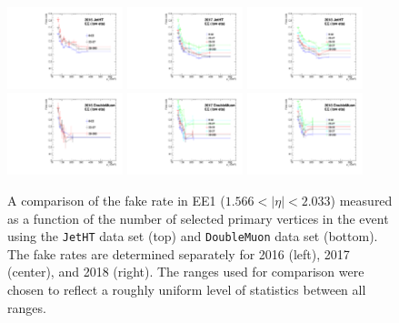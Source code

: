\begin{figure}[!htbp]
\centering
\includegraphics[width=0.3\textwidth]{fig/compare_pv_EE1_2016_jetht.pdf}
\includegraphics[width=0.3\textwidth]{fig/compare_pv_EE1_2017_jetht.pdf}
\includegraphics[width=0.3\textwidth]{fig/compare_pv_EE1_2018_jetht.pdf}
\includegraphics[width=0.3\textwidth]{fig/compare_pv_EE1_2016_doublemuon.pdf}
\includegraphics[width=0.3\textwidth]{fig/compare_pv_EE1_2017_doublemuon.pdf}
\includegraphics[width=0.3\textwidth]{fig/compare_pv_EE1_2018_doublemuon.pdf}
\caption{A comparison of the fake rate in EE1 ($1.566 < |\eta| < 2.033$) measured as a function of the number of selected primary vertices in the event using the \texttt{JetHT} data set (top) and \texttt{DoubleMuon} data set (bottom). The fake rates are determined separately for 2016 (left), 2017 (center), and 2018 (right). The ranges used for comparison were chosen to reflect a roughly uniform level of statistics between all ranges.}
\label{fig:frpileup_EE1}
\end{figure}


